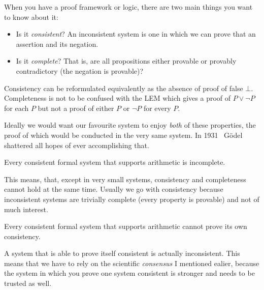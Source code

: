 When you have a proof framework or logic, there are two main things you want to
know about it:
\begin{itemize}
  \item Is it \emph{consistent}? An inconsistent system is one in which we can
  prove that an assertion and its negation.
  \item Is it \emph{complete}? That is, are all propositions either provable
  or provably contradictory (\ie the negation is provable)?
\end{itemize}

Consistency can be reformulated equivalently as the absence of proof of false
\(\bot\).
Completeness is not to be confused with the \acrshort{LEM} which gives a proof
of \(P \vee \neg P\) for each \(P\) but not a proof of either \(P\) or
\(\neg P\) for every \(P\).

Ideally we would want our favourite system to enjoy \emph{both} of these
properties, the proof of which would be conducted in the very same system.
In 1931~ Gödel shattered all hopes of ever
accomplishing that.

\begin{theorem}
  Every consistent formal system that supports arithmetic is incomplete.
\end{theorem}

This means, that, except in very small systems, consistency and completeness
cannot hold at the same time. Usually we go with consistency because
inconsistent systems are trivially complete (every property is provable) and not
of much interest.

\begin{theorem}
  Every consistent formal system that supports arithmetic cannot prove its
  own consistency.
\end{theorem}
A system that is able to prove itself consistent is actually inconsistent.
This means that we have to rely on the scientific \emph{consensus} I mentioned
ealier, because the system in which you prove one system consistent is stronger
and needs to be trusted as well.

